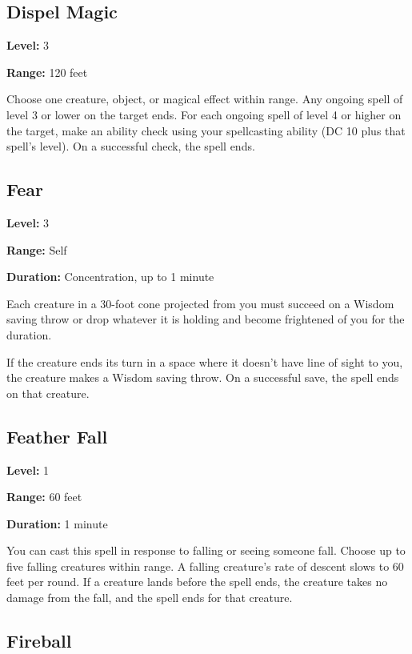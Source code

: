 \documentclass[12pt,letterpaper,twocolumn,openany,nodeprecatedcode,bg=none]{dndbook}
\let\oldsubsection\subsection
\renewcommand{\subsection}[1]{%
  \needspace{5\baselineskip}%
  \oldsubsection{#1}%
}
\begin{document}
\subsection{Dispel Magic}\label{dispel-magic}

\textbf{Level:} 3

\textbf{Range:} 120 feet

Choose one creature, object, or magical effect within range. Any ongoing
spell of level 3 or lower on the target ends. For each ongoing spell of
level 4 or higher on the target, make an ability check using your
spellcasting ability (DC 10 plus that spell's level). On a successful
check, the spell ends.

\subsection{Fear}\label{fear}

\textbf{Level:} 3

\textbf{Range:} Self

\textbf{Duration:} Concentration, up to 1 minute

Each creature in a 30-foot cone projected from you must succeed on a
Wisdom saving throw or drop whatever it is holding and become frightened
of you for the duration.

If the creature ends its turn in a space where it doesn't have line of
sight to you, the creature makes a Wisdom saving throw. On a successful
save, the spell ends on that creature.

\subsection{Feather Fall}\label{feather-fall}

\textbf{Level:} 1

\textbf{Range:} 60 feet

\textbf{Duration:} 1 minute

You can cast this spell in response to falling or seeing someone fall.
Choose up to five falling creatures within range. A falling creature's
rate of descent slows to 60 feet per round. If a creature lands before
the spell ends, the creature takes no damage from the fall, and the
spell ends for that creature.

\subsection{Fireball}\label{fireball}
\end{document}
